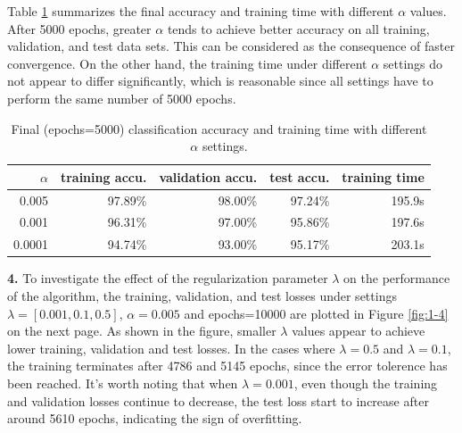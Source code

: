 \documentclass[12pt]{article}
\newenvironment{problem}[2][Problem]{\begin{trivlist}
\item[\hskip \labelsep {\bfseries #1}\hskip \labelsep {\bfseries #2.}]}{\end{trivlist}}
\begin{document}
\begin{problem}{1}
Table \ref{table:1-3} summarizes the final accuracy and training time with different $\alpha$ values. After 5000 epochs, greater $\alpha$ tends to achieve better accuracy on all training, validation, and test data sets. This can be considered as the consequence of faster convergence. On the other hand, the training time under different $\alpha$ settings do not appear to differ significantly, which is reasonable since all settings have to perform the same number of 5000 epochs.
\begin{table}[!htb]
\center
\begin{tabular}{rrrrr}
\hline
$\alpha$ & training accu. & validation accu. & test accu. & training time \\ \hline
0.005    & 97.89\%  & 98.00\%    & 97.24\% & 195.9s \\
0.001    & 96.31\%  & 97.00\%    & 95.86\% & 197.6s \\
0.0001   & 94.74\%  & 93.00\%    & 95.17\% & 203.1s \\ \hline
\end{tabular}
\caption{Final (epochs=5000) classification accuracy and training time with different $\alpha$ settings.}
\label{table:1-3}
\end{table}
\bigskip
\newpage
\textbf{4.} To investigate the effect of the regularization parameter $\lambda$ on the performance of the algorithm, the training, validation, and test losses under settings  $\lambda=[0.001, 0.1, 0.5]$, $\alpha=0.005$ and epochs=10000 are plotted in Figure \ref{fig:1-4} on the next page.
As shown in the figure, smaller $\lambda$ values appear to achieve lower training, validation and test losses. In the cases where $\lambda=0.5$ and $\lambda=0.1$, the training terminates after 4786 and 5145 epochs, since the error tolerence has been reached. It's worth noting that when $\lambda=0.001$, even though the training and validation losses continue to decrease, the test loss start to increase after around 5610 epochs, indicating the sign of overfitting.  



\end{problem}
\end{document}
